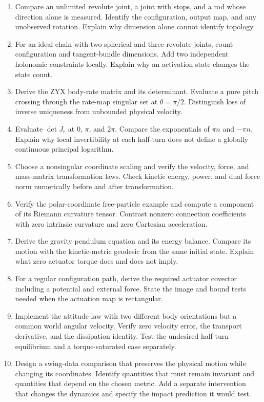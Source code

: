\begin{enumerate}[itemsep=3pt,parsep=0pt]
\item Compare an unlimited revolute joint, a joint with stops, and a rod whose
direction alone is measured. Identify the configuration, output map, and any
unobserved rotation. Explain why dimension alone cannot identify topology.
\item For an ideal chain with two spherical and three revolute joints, count
configuration and tangent-bundle dimensions. Add two independent holonomic
constraints locally. Explain why an activation state changes the state count.
\item Derive the ZYX body-rate matrix and its determinant. Evaluate a pure
pitch crossing through the rate-map singular set at $\theta=\pi/2$.
Distinguish loss of inverse uniqueness from unbounded physical velocity.
\item Evaluate $\det J_r$ at $0$, $\pi$, and $2\pi$. Compare the exponentials
of $\pi n$ and $-\pi n$. Explain why local invertibility at each half-turn
does not define a globally continuous principal logarithm.
\item Choose a nonsingular coordinate scaling and verify the velocity, force,
and mass-matrix transformation laws. Check kinetic energy, power, and dual
force norm numerically before and after transformation.
\item Verify the polar-coordinate free-particle example and compute a component
of its Riemann curvature tensor. Contrast nonzero connection coefficients
with zero intrinsic curvature and zero Cartesian acceleration.
\item Derive the gravity pendulum equation and its energy balance. Compare
its motion with the kinetic-metric geodesic from the same initial state.
Explain what zero actuator torque does and does not imply.
\item For a regular configuration path, derive the required actuator covector
including a potential and external force. State the image and bound tests
needed when the actuation map is rectangular.
\item Implement the attitude law with two different body orientations but a
common world angular velocity. Verify zero velocity error, the transport
derivative, and the dissipation identity. Test the undesired half-turn
equilibrium and a torque-saturated case separately.
\item Design a swing-data comparison that preserves the physical motion while
changing its coordinates. Identify quantities that must remain invariant and
quantities that depend on the chosen metric. Add a separate intervention that
changes the dynamics and specify the impact prediction it would test.
\end{enumerate}

